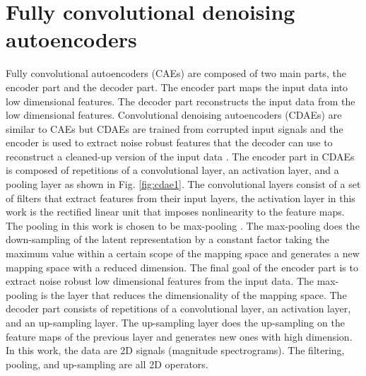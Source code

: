\documentclass{article}
\begin{document}
\section{Fully convolutional denoising autoencoders}
\label{fcda}
Fully convolutional autoencoders (CAEs) \cite{Jonathan:11:scaehfe,Bo:17:scdaefr} are composed of two main parts, the encoder part and the decoder part. The encoder part maps the input data into low dimensional features. The decoder part reconstructs the input data from the low dimensional features. Convolutional denoising autoencoders (CDAEs) are similar to CAEs but CDAEs are trained from corrupted input signals and the encoder is used to extract noise robust features that the decoder can use to reconstruct a cleaned-up version of the input data \cite{se:16:fcnnse,Mengyuan:16:mrcdasr}. The encoder part in CDAEs is composed of repetitions of a convolutional layer, an activation layer, and a pooling layer as shown in Fig. \ref{fig:cdae1}. The convolutional layers consist of a set of filters that extract features from their input layers, the activation layer in this work is the rectified linear unit that imposes nonlinearity to the feature maps. The pooling in this work is chosen to be max-pooling \cite{Dominik:10:epocaor}. The max-pooling does the down-sampling of the latent representation by a constant factor taking the maximum value within a certain scope of the mapping space and generates a new mapping space with a reduced dimension. %
The final goal of the  encoder part is to extract noise robust low dimensional features from the input data. The max-pooling is the layer that reduces the dimensionality of the mapping space. The decoder part consists of repetitions of a convolutional layer, an activation layer, and an up-sampling layer. The up-sampling layer does the up-sampling on the feature maps of the previous layer and generates new ones with high dimension. In this work, the data are 2D signals (magnitude spectrograms). The filtering, pooling, and up-sampling are all 2D operators. %
\end{document}
